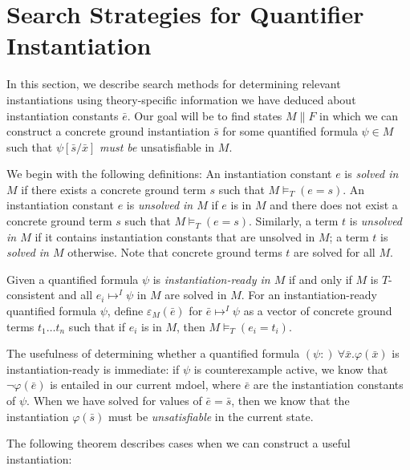 \documentclass{llncs}
\begin{document}
\section{Search Strategies for Quantifier Instantiation}

In this section, we describe search methods for determining relevant instantiations using theory-specific information we have deduced about instantiation constants $\bar{e}$.
Our goal will be to find states $M \parallel F$ in which we can construct a concrete ground instantiation $\bar{s}$ for some quantified formula $\psi \in M$ such that $\psi [\bar{s}/\bar{x}]$ \emph{must be} unsatisfiable in $M$.

We begin with the following definitions:
An instantiation constant $e$ is \emph{solved in $M$} if there exists a concrete ground term $s$ such that $M \models_T (e = s)$.
An instantiation constant $e$ is \emph{unsolved in $M$} if $e$ is in $M$ and there does not exist a concrete ground term $s$ such that $M \models_T (e = s)$.
Similarly, a term $t$ is \emph{unsolved in $M$} if it contains instantiation constants that are unsolved in $M$; a term $t$ is \emph{solved in $M$} otherwise.
Note that concrete ground terms $t$ are solved for all $M$.

Given a quantified formula $\psi$ is \emph{instantiation-ready in $M$} if and only if $M$ is $T$-consistent and all $e_i \mapsto^I \psi$ in $M$ are solved in $M$.
For an instantiation-ready quantified formula $\psi$, define $\varepsilon_M( \bar{e} )$ for $\bar{e} \mapsto^I \psi$ as a vector of concrete ground terms $t_1 \ldots t_n$ such that if $e_i$ is in $M$, then $M \models_T (e_i = t_i)$.

The usefulness of determining whether a quantified formula $(\psi:) \ \forall \bar{x}. \varphi( \bar{x} )$ is instantiation-ready is immediate:  if $\psi$ is counterexample active, we know that $\neg \varphi( \bar{e} )$ is entailed in our current mdoel, where $\bar{e}$ are the instantiation constants of $\psi$.
When we have solved for values of $\bar{e} = \bar{s}$, then we know that the instantiation $\varphi( \bar{s} )$ must be \emph{unsatisfiable} in the current state.

The following theorem describes cases when we can construct a useful instantiation:
\end{document}
